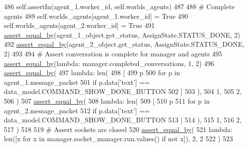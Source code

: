\begin{DoxyCode}
486         self.assertIn(agent\_1.worker\_id, self.worlds\_agents)
487 
488         \textcolor{comment}{# Complete agents}
489         self.worlds\_agents[agent\_1.worker\_id] = \textcolor{keyword}{True}
490         self.worlds\_agents[agent\_2.worker\_id] = \textcolor{keyword}{True}
491         \hyperlink{namespaceparlai_1_1mturk_1_1core_1_1test_1_1test__full__system_a0b463246d35658a2e422010f13dcf819}{assert\_equal\_by}(agent\_1\_object.get\_status, AssignState.STATUS\_DONE, 2)
492         \hyperlink{namespaceparlai_1_1mturk_1_1core_1_1test_1_1test__full__system_a0b463246d35658a2e422010f13dcf819}{assert\_equal\_by}(agent\_2\_object.get\_status, AssignState.STATUS\_DONE, 2)
493 
494         \textcolor{comment}{# Assert conversation is complete for manager and agents}
495         \hyperlink{namespaceparlai_1_1mturk_1_1core_1_1test_1_1test__full__system_a0b463246d35658a2e422010f13dcf819}{assert\_equal\_by}(\textcolor{keyword}{lambda}: manager.completed\_conversations, 1, 2)
496         \hyperlink{namespaceparlai_1_1mturk_1_1core_1_1test_1_1test__full__system_a0b463246d35658a2e422010f13dcf819}{assert\_equal\_by}(
497             \textcolor{keyword}{lambda}: len(
498                 [
499                     p
500                     \textcolor{keywordflow}{for} p \textcolor{keywordflow}{in} agent\_1.message\_packet
501                     \textcolor{keywordflow}{if} p.data[\textcolor{stringliteral}{'text'}] == data\_model.COMMAND\_SHOW\_DONE\_BUTTON
502                 ]
503             ),
504             1,
505             2,
506         )
507         \hyperlink{namespaceparlai_1_1mturk_1_1core_1_1test_1_1test__full__system_a0b463246d35658a2e422010f13dcf819}{assert\_equal\_by}(
508             \textcolor{keyword}{lambda}: len(
509                 [
510                     p
511                     \textcolor{keywordflow}{for} p \textcolor{keywordflow}{in} agent\_2.message\_packet
512                     \textcolor{keywordflow}{if} p.data[\textcolor{stringliteral}{'text'}] == data\_model.COMMAND\_SHOW\_DONE\_BUTTON
513                 ]
514             ),
515             1,
516             2,
517         )
518 
519         \textcolor{comment}{# Assert sockets are closed}
520         \hyperlink{namespaceparlai_1_1mturk_1_1core_1_1test_1_1test__full__system_a0b463246d35658a2e422010f13dcf819}{assert\_equal\_by}(
521             \textcolor{keyword}{lambda}: len([x \textcolor{keywordflow}{for} x \textcolor{keywordflow}{in} manager.socket\_manager.run.values() \textcolor{keywordflow}{if} \textcolor{keywordflow}{not} x]), 2, 2
522         )
523 
\end{DoxyCode}


